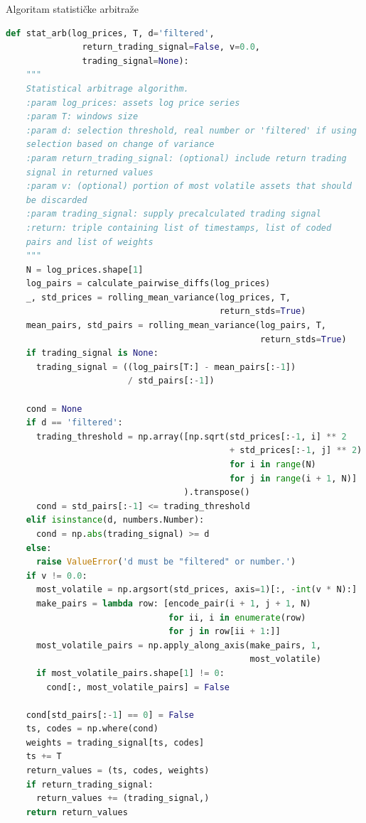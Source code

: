 \documentclass[lmodern, utf8, diplomski, numeric]{fer}
\begin{document}
  \begin{description}
    \item[Algoritam statističke arbitraže]
  \end{description}
  \begin{lstlisting}[language=Python, basicstyle=\footnotesize\ttfamily]
  def stat_arb(log_prices, T, d='filtered',
               return_trading_signal=False, v=0.0,
               trading_signal=None):
    """
    Statistical arbitrage algorithm. 
    :param log_prices: assets log price series
    :param T: windows size
    :param d: selection threshold, real number or 'filtered' if using
    selection based on change of variance 
    :param return_trading_signal: (optional) include return trading
    signal in returned values
    :param v: (optional) portion of most volatile assets that should
    be discarded 
    :param trading_signal: supply precalculated trading signal 
    :return: triple containing list of timestamps, list of coded
    pairs and list of weights
    """
    N = log_prices.shape[1]
    log_pairs = calculate_pairwise_diffs(log_prices)
    _, std_prices = rolling_mean_variance(log_prices, T,
                                          return_stds=True)
    mean_pairs, std_pairs = rolling_mean_variance(log_pairs, T,
                                                  return_stds=True)
    if trading_signal is None:
      trading_signal = ((log_pairs[T:] - mean_pairs[:-1])
                        / std_pairs[:-1])

    cond = None
    if d == 'filtered':
      trading_threshold = np.array([np.sqrt(std_prices[:-1, i] ** 2
                                            + std_prices[:-1, j] ** 2)
                                            for i in range(N)
                                            for j in range(i + 1, N)]
                                   ).transpose()
      cond = std_pairs[:-1] <= trading_threshold
    elif isinstance(d, numbers.Number):
      cond = np.abs(trading_signal) >= d
    else:
      raise ValueError('d must be "filtered" or number.')
    if v != 0.0:
      most_volatile = np.argsort(std_prices, axis=1)[:, -int(v * N):]
      make_pairs = lambda row: [encode_pair(i + 1, j + 1, N)
                                for ii, i in enumerate(row)
                                for j in row[ii + 1:]]
      most_volatile_pairs = np.apply_along_axis(make_pairs, 1,
                                                most_volatile)
      if most_volatile_pairs.shape[1] != 0:
        cond[:, most_volatile_pairs] = False
        
    cond[std_pairs[:-1] == 0] = False
    ts, codes = np.where(cond)
    weights = trading_signal[ts, codes]
    ts += T
    return_values = (ts, codes, weights)
    if return_trading_signal:
      return_values += (trading_signal,)
    return return_values
  \end{lstlisting}
    
\end{document}
